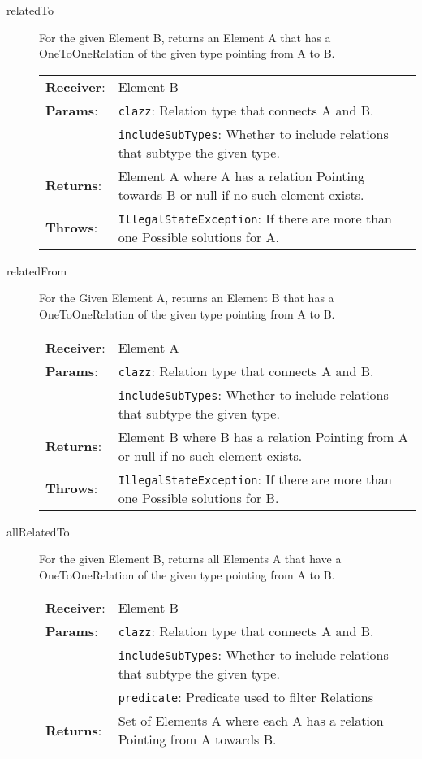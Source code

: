 \begin{description}
  \item[relatedTo] For the given Element B, returns an Element A that has a OneToOneRelation of the given type pointing from A to B.

        \begin{tabularx}{\linewidth}{ l X }
          \textbf{Receiver}: & Element B
          \\
          \textbf{Params}:   & \texttt{clazz}: Relation type that connects A and B.
          \\
                             & \texttt{includeSubTypes}: Whether to include relations that subtype the given type.
          \\
          \textbf{Returns}:  & Element A where A has a relation Pointing towards B or null if no such element exists.
          \\
          \textbf{Throws}:   & \texttt{IllegalStateException}: If there are more than one Possible solutions for A.
        \end{tabularx}

  \item[relatedFrom] For the Given Element A, returns an Element B that has a OneToOneRelation of the given type pointing from A to B.

        \begin{tabularx}{\linewidth}{ l X }
          \textbf{Receiver}: & Element A
          \\
          \textbf{Params}:   & \texttt{clazz}: Relation type that connects A and B.
          \\
                             & \texttt{includeSubTypes}: Whether to include relations that subtype the given type.
          \\
          \textbf{Returns}:  & Element B where B has a relation Pointing from A or null if no such element exists.
          \\
          \textbf{Throws}:   & \texttt{IllegalStateException}: If there are more than one Possible solutions for B.
        \end{tabularx}

  \item[allRelatedTo] For the given Element B, returns all Elements A that have a OneToOneRelation of the given type pointing from A to B.

        \begin{tabularx}{\linewidth}{ l X }
          \textbf{Receiver}: & Element B
          \\
          \textbf{Params}:   & \texttt{clazz}: Relation type that connects A and B.
          \\
                             & \texttt{includeSubTypes}: Whether to include relations that subtype the given type.
          \\
                             & \texttt{predicate}: Predicate used to filter Relations
          \\
          \textbf{Returns}:  & Set of Elements A where each A has a relation Pointing from A towards B.
        \end{tabularx}


\end{description}
